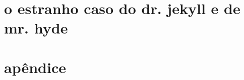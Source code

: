 \documentclass[10pt]{hedrabook}
\begin{document}
\ifodd\thepage\paginabranca\fi

\endgroup
\setcounter{tocdepth}{0}     %
\setcounter{secnumdepth}{-2} %

\hedratoc

\fontsize{10.5pt}{\baselineskip}\selectfont
\baselineskip=12.6pt   %



\part{o estranho caso do dr. jekyll e de mr. hyde}

\part{apêndice}




\ifdefined\printcheck\printcheck\fi
\end{document}
